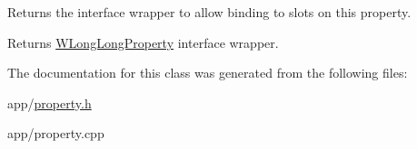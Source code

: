 Returns the interface wrapper to allow binding to slots on this property. 

\begin{DoxyReturn}{Returns}
\hyperlink{class_w_long_long_property}{W\-Long\-Long\-Property} interface wrapper. 
\end{DoxyReturn}


The documentation for this class was generated from the following files\-:\begin{DoxyCompactItemize}
\item 
app/\hyperlink{property_8h}{property.\-h}\item 
app/property.\-cpp\end{DoxyCompactItemize}
